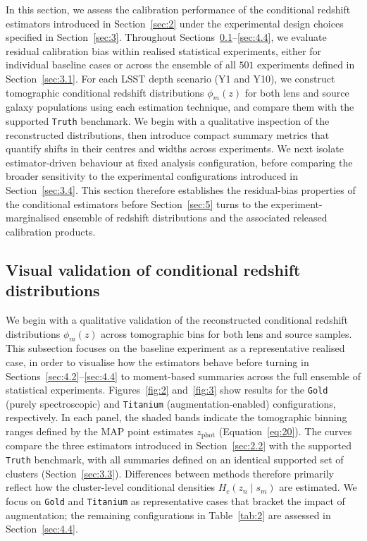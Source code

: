 In this section, we assess the calibration performance of the conditional redshift estimators introduced in Section~\ref{sec:2} under the experimental design choices specified in Section~\ref{sec:3}. Throughout Sections~\ref{sec:4.1}--\ref{sec:4.4}, we evaluate residual calibration bias within realised statistical experiments, either for individual baseline cases or across the ensemble of all \(501\) experiments defined in Section~\ref{sec:3.1}. For each LSST depth scenario (Y1 and Y10), we construct tomographic conditional redshift distributions \(\phi_m(z)\) for both lens and source galaxy populations using each estimation technique, and compare them with the supported \texttt{Truth} benchmark. We begin with a qualitative inspection of the reconstructed distributions, then introduce compact summary metrics that quantify shifts in their centres and widths across experiments. We next isolate estimator-driven behaviour at fixed analysis configuration, before comparing the broader sensitivity to the experimental configurations introduced in Section~\ref{sec:3.4}. This section therefore establishes the residual-bias properties of the conditional estimators before Section~\ref{sec:5} turns to the experiment-marginalised ensemble of redshift distributions and the associated released calibration products.

\subsection{Visual validation of conditional redshift distributions} \label{sec:4.1}

We begin with a qualitative validation of the reconstructed conditional redshift distributions \(\phi_m(z)\) across tomographic bins for both lens and source samples. This subsection focuses on the baseline experiment as a representative realised case, in order to visualise how the estimators behave before turning in Sections~\ref{sec:4.2}--\ref{sec:4.4} to moment-based summaries across the full ensemble of statistical experiments. Figures~\ref{fig:2} and~\ref{fig:3} show results for the \texttt{Gold} (purely spectroscopic) and \texttt{Titanium} (augmentation-enabled) configurations, respectively. In each panel, the shaded bands indicate the tomographic binning ranges defined by the MAP point estimates \(z_{\text{phot}}\) (Equation~\ref{eq:20}). The curves compare the three estimators introduced in Section~\ref{sec:2.2} with the supported \texttt{Truth} benchmark, with all summaries defined on an identical supported set of clusters (Section~\ref{sec:3.3}). Differences between methods therefore primarily reflect how the cluster-level conditional densities \(H_c(z_n\mid s_m)\) are estimated. We focus on \texttt{Gold} and \texttt{Titanium} as representative cases that bracket the impact of augmentation; the remaining configurations in Table~\ref{tab:2} are assessed in Section~\ref{sec:4.4}.


